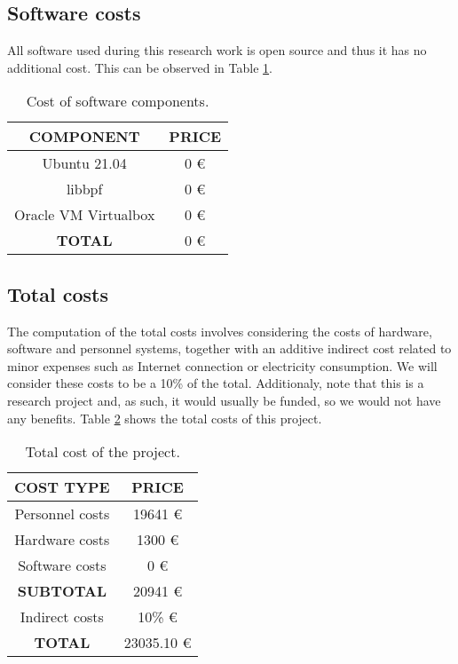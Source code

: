 \subsection{Software costs}
All software used during this research work is open source and thus it has no additional cost. This can be observed in Table \ref{table:software_costs}.
\begin{table}[htbp]
\begin{tabular}{|c|c|}
\hline
\textbf{COMPONENT} & \textbf{PRICE}\\
\hline
\hline
Ubuntu 21.04 & 0 € \\
\hline
libbpf & 0 € \\
\hline
Oracle VM Virtualbox & 0 € \\
\hline
\textbf{TOTAL} & 0 €\\
\hline
\end{tabular}
\caption{Cost of software components.}
\label{table:software_costs}
\end{table}

\subsection{Total costs}
The computation of the total costs involves considering the costs of hardware, software and personnel systems, together with an additive indirect cost related to minor expenses such as Internet connection or electricity consumption. We will consider these costs to be a 10\% of the total. Additionaly, note that this is a research project and, as such, it would usually be funded, so we would not have any benefits. Table \ref{table:total_costs} shows the total costs of this project.

\begin{table}[htbp]
\begin{tabular}{|c|c|}
\hline
\textbf{COST TYPE} & \textbf{PRICE}\\
\hline
\hline
Personnel costs & 19641 € \\
\hline
Hardware costs & 1300 € \\
\hline
Software costs & 0 € \\
\hline
\textbf{SUBTOTAL} & 20941 €\\
\hline
Indirect costs & 10\% €\\
\hline
\textbf{TOTAL} & 23035.10 €\\
\hline
\end{tabular}
\caption{Total cost of the project.}
\label{table:total_costs}
\end{table}